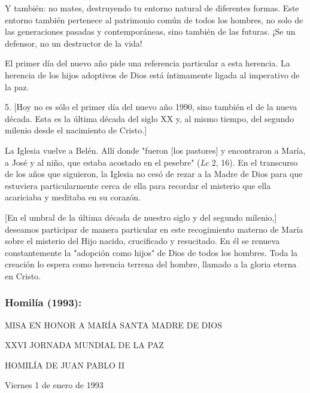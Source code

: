 \begin{body}
Y también: no mates, destruyendo tu entorno natural de diferentes formas. Este entorno también pertenece al patrimonio común de todos los hombres, no solo de las generaciones pasadas y contemporáneas, sino también de las futuras. ¡Se un defensor, no un destructor de la vida!

El primer día del nuevo año pide una referencia particular a esta herencia. La herencia de los hijos adoptivos de Dios está íntimamente ligada al imperativo de la paz.

5. {[}Hoy no es sólo el primer día del nuevo año 1990, sino también el de la nueva década. Esta es la última década del siglo XX y, al mismo tiempo, del segundo milenio desde el nacimiento de Cristo.{]}

La Iglesia vuelve a Belén. Allí donde "fueron {[}los pastores{]} y encontraron a María, a José y al niño, que estaba acostado en el pesebre" (\emph{Lc} 2, 16). En el transcurso de los años que siguieron, la Iglesia no cesó de rezar a la Madre de Dios para que estuviera particularmente cerca de ella para recordar el misterio que ella acariciaba y meditaba en su corazón.

{[}En el umbral de la última década de nuestro siglo y del segundo milenio,{]} deseamos participar de manera particular en este recogimiento materno de María sobre el misterio del Hijo nacido, crucificado y resucitado. En él se renueva constantemente la "adopción como hijos" de Dios de todos los hombres. Toda la creación lo espera como herencia terrena del hombre, llamado a la gloria eterna en Cristo.

\subsubsection{Homilía (1993): } MISA EN HONOR A MARÍA SANTA MADRE DE DIOS

XXVI JORNADA MUNDIAL DE LA PAZ

HOMILÍA DE JUAN PABLO II

Viernes 1 de enero de 1993


\end{body}
